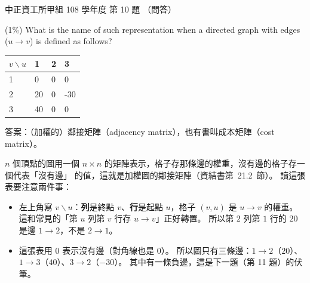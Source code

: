 \begin{pastexam}[label={px:ccu-108-swa-09}]{中正資工所甲組 108 學年度 第 10 題}
（問答）

(1\%) What is the name of such representation when a directed graph with edges ($u\to v$) is
defined as follows?

\begin{center}
\begin{tabular}{|l|l|l|l|}\hline
$v \backslash u$ & 1 & 2 & 3\\\hline
1 & 0 & 0 & 0\\\hline
2 & 20 & 0 & -30\\\hline
3 & 40 & 0 & 0\\\hline
\end{tabular}
\end{center}
\end{pastexam}

\begin{pastsoln}
答案：（加權的）鄰接矩陣（adjacency matrix），也有書叫成本矩陣（cost matrix）。

$n$ 個頂點的圖用一個 $n \times n$ 的矩陣表示，格子存那條邊的權重，沒有邊的格子存一個代表「沒有邊」
的值，這就是加權圖的鄰接矩陣（資結書第~21.2~節）。 讀這張表要注意兩件事：
\begin{itemize}
\item 左上角寫 $v \backslash u$：\textbf{列}是終點 $v$、\textbf{行}是起點 $u$，格子 $(v, u)$ 是
$u \to v$ 的權重。 這和常見的「第 $u$ 列第 $v$ 行存 $u \to v$」正好轉置。 所以第 $2$ 列第 $1$ 行的
$20$ 是邊 $1 \to 2$，不是 $2 \to 1$。
\item 這張表用 $0$ 表示沒有邊（對角線也是 $0$）。 所以圖只有三條邊：$1 \to 2$（$20$）、
$1 \to 3$（$40$）、$3 \to 2$（$-30$）。 其中有一條負邊，這是下一題（第 11 題）的伏筆。
\end{itemize}
\end{pastsoln}
